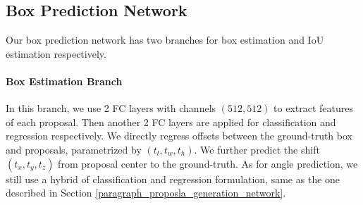 \documentclass[10pt,twocolumn,letterpaper]{article}
\begin{document}
\subsection{Box Prediction Network}
Our box prediction network has two branches for box estimation and IoU estimation respectively.

\vspace{-0.1in}
\paragraph{Box Estimation Branch}
In this branch, we use 2 FC layers with channels $(512, 512)$ to extract features of each proposal. Then another 2 FC layers are applied for classification and regression respectively. We directly regress offsets between the ground-truth box and proposals, parametrized by $(t_l, t_w, t_h)$. We further predict the shift $(t_x, t_y, t_z)$ from proposal center to the ground-truth. As for angle prediction, we still use a hybrid of classification and regression formulation, same as the one described in Section \ref{paragraph_proposla_generation_network}.

\begin{comment}
\begin{algorithm}[bpt]
\caption{3D-Bev IoU guided Ensemble.}\label{iou_guided_ensemble}
\begin{algorithmic}[1]
\REQUIRE ~~\\
$B=\{b_1, b_2, ...,b_n\}, I_{3D}, I_{BEV}, S, \delta$ \\ 
$B$: the set of detected 3D bounding boxes. \\
$I_{3D}, I_{BEV}$: prediced 3D and BEV IoU for each box. \\
$S$: classification score for each box. \\
$\delta$: IoU for NMS threshold. \\
\ENSURE ~~\\
$D$: the predicted 3D bounding boxes. \\
$D_S$: the predicted classification score. \\
\STATE $D \gets \phi$ \\ 
\label{ code:fram:1 }
\WHILE{$B \ne \phi$}
\STATE $b_m \gets arg~max(I_{3D} \times S)$
\STATE $B \gets B \diagdown \{b_m\}$ 
\STATE $s \gets S(b_m) \times I_{3D}(b_m)$
\STATE $i \gets I_{BEV}(b_m)$
\STATE $u_m \gets b_m$
\FOR{$b_j \in B$}
\IF{$IoU(b_m, b_j) > \delta$}
\STATE $B \gets B \diagdown {b_j}$
\IF{$i < I_{BEV}(b_j)$}
\STATE $i \gets I_{BEV}(b_j)$
\STATE $u_m \gets (b_{jx}, u_{my}, b_{jz}, b_{jl}, u_{mh}, b_{jw}, b_{j\theta})$
\ENDIF
\label{ code:fram:2 }
\ENDIF
\label{ code:fram:3 }
\ENDFOR
\label{ code:fram:4 }
\STATE $D \gets D \cup \{u_m\}$
\STATE $D_S \gets D_S \cup \{s\}$
\ENDWHILE
\label{code:fram:5 }
\RETURN $D, D_S$;
\end{algorithmic}
\end{algorithm}
\end{comment}
\end{document}
